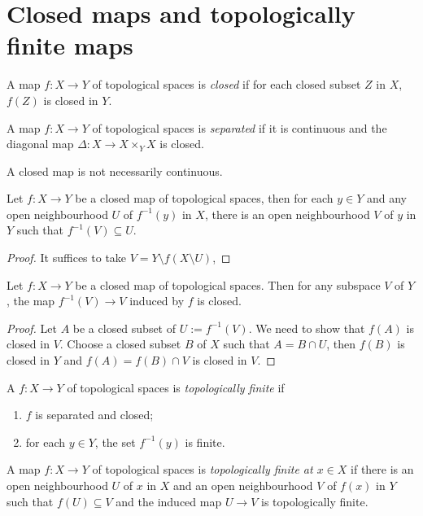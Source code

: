 \section{Closed maps and topologically finite maps}

\begin{definition}
    A map $f:X\rightarrow Y$ of topological spaces is \emph{closed} if for each closed subset $Z$ in $X$, $f(Z)$ is closed in $Y$.

    A map $f:X\rightarrow Y$ of topological spaces is \emph{separated} if it is continuous and the diagonal map $\Delta:X\rightarrow X\times_Y X$ is closed.
\end{definition}
A closed map is not necessarily continuous.

\begin{lemma}\label{lma-opennhfiberclosedmap}
    Let $f:X\rightarrow Y$ be a closed map of topological spaces, then for each $y\in Y$ and any open neighbourhood $U$ of $f^{-1}(y)$ in $X$, there is an open neighbourhood $V$ of $y$ in $Y$ such that $f^{-1}(V)\subseteq U$.
\end{lemma}
\begin{proof}
    It suffices to take $V=Y\setminus f(X\setminus U)$,
\end{proof}
\begin{lemma}\label{lma-closedmaprestricttarget}
    Let $f:X\rightarrow Y$ be a closed map of topological spaces. Then for any subspace $V$ of $Y$, the map $f^{-1}(V)\rightarrow V$ induced by $f$ is closed.
\end{lemma}
\begin{proof}
    Let $A$ be a closed subset of $U:=f^{-1}(V)$. We need to show that $f(A)$ is closed in $V$. Choose a closed subset $B$ of $X$ such that $A=B\cap U$, then $f(B)$ is closed in $Y$ and $f(A)=f(B)\cap V$ is closed in $V$.
\end{proof}

\begin{definition}
    A $f:X\rightarrow Y$ of topological spaces is \emph{topologically finite} if 
    \begin{enumerate}
        \item $f$ is separated and closed;
        \item for each $y\in Y$, the set $f^{-1}(y)$ is finite.
    \end{enumerate}

    A map $f:X\rightarrow Y$ of topological spaces is \emph{topologically finite at $x\in X$} if there is an open neighbourhood $U$ of $x$ in $X$ and an open neighbourhood $V$ of $f(x)$ in $Y$ such that $f(U)\subseteq V$ and the induced map $U\rightarrow V$ is topologically finite.
\end{definition}


